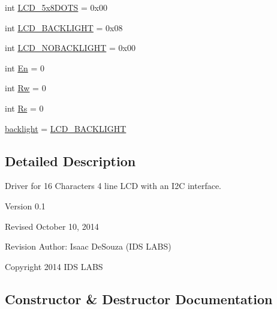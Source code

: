 \begin{DoxyCompactItemize}
\item 
int \hyperlink{classdriver_1_1DRIVER__CORE_1_1LCD_a3827f35e7fdc2e87e310b96946ea4a31}{L\+C\+D\+\_\+5x8\+D\+O\+T\+S} = 0x00
\item 
int \hyperlink{classdriver_1_1DRIVER__CORE_1_1LCD_a451bdfdb9070424538d887ff2537cbd4}{L\+C\+D\+\_\+\+B\+A\+C\+K\+L\+I\+G\+H\+T} = 0x08
\item 
int \hyperlink{classdriver_1_1DRIVER__CORE_1_1LCD_ab91efc280a324865386ba4225edb938c}{L\+C\+D\+\_\+\+N\+O\+B\+A\+C\+K\+L\+I\+G\+H\+T} = 0x00
\item 
int \hyperlink{classdriver_1_1DRIVER__CORE_1_1LCD_a2bd95d3e054fb4f31d460e0f6cc5d4b9}{En} = 0
\item 
int \hyperlink{classdriver_1_1DRIVER__CORE_1_1LCD_a3d390e26af88fa58f0a5a2071c2dadc4}{Rw} = 0
\item 
int \hyperlink{classdriver_1_1DRIVER__CORE_1_1LCD_a3b3638ad9241c610826a457a208db03e}{Rs} = 0
\item 
\hyperlink{classdriver_1_1DRIVER__CORE_1_1LCD_a3859d28df51e47968c03ff79c6d6ddcb}{backlight} = \hyperlink{classdriver_1_1DRIVER__CORE_1_1LCD_a451bdfdb9070424538d887ff2537cbd4}{L\+C\+D\+\_\+\+B\+A\+C\+K\+L\+I\+G\+H\+T}
\end{DoxyCompactItemize}


\subsection{Detailed Description}
\begin{DoxyVerb}Driver for 16 Characters 4 line LCD with an I2C interface.

Version 0.1

Revised October 10, 2014

Revision Author: Isaac DeSouza (IDS LABS)

Copyright 2014 IDS LABS
\end{DoxyVerb}
 

\subsection{Constructor \& Destructor Documentation}
\hypertarget{classdriver_1_1DRIVER__CORE_1_1LCD_a42d8dfae2030675de36c798311a4c081}{}
